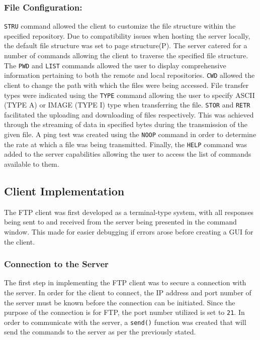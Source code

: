 \documentclass[10pt, conference]{IEEEtran}
\def\code#1{\texttt{#1}}
\begin{document}
\subsubsection{File Configuration:}
\texttt{STRU} command allowed the client to customize the file structure within the specified repository. Due to compatibility issues when hosting the server locally, the default file structure was set to page structure(P). The server catered for a number of commands allowing the client to traverse the specified file structure. The \texttt{PWD} and \texttt{LIST} commands allowed the user to display comprehensive information pertaining to both the remote and local repositories. \texttt{CWD} allowed the client to change the path with which the files were being accessed. File transfer types were indicated using the \texttt{TYPE} command allowing the user to specify ASCII (TYPE A) or IMAGE (TYPE I) type when transferring the file. \texttt{STOR} and \texttt{RETR} facilitated the uploading and downloading of files respectively. This was achieved through the streaming of data in specified bytes during the transmission of the given file. A ping test was created using the \texttt{NOOP} command in order to determine the rate at which a file was being transmitted. Finally, the \texttt{HELP} command was added to the server capabilities allowing the user to access the list of commands available to them.

\subsection{Client Implementation}
\label{sec: Client Implementation}
The FTP client was first developed as a terminal-type system, with all responses being sent to and received from the server being presented in the command window. This made for easier debugging if errors arose before creating a GUI for the client.

\subsubsection{Connection to the Server}
\label{sec: Connection to server}
The first step in implementing the FTP client was to secure a connection with the server. In order for the client to connect, the IP address and port number of the server must be known before the connection can be initiated. Since the purpose of the connection is for FTP, the port number utilized is set to \code{21}. In order to communicate with the server, a \code{send()} function was created that will send the commands to the server as per the previously stated.
\end{document}
